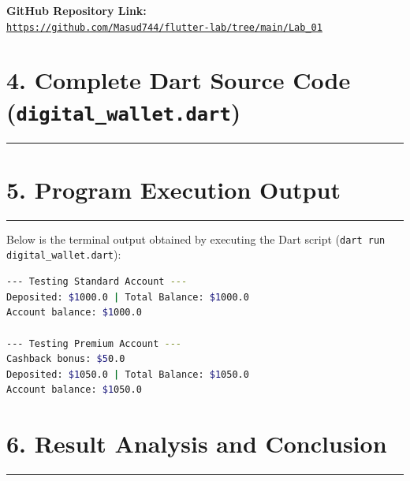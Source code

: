 \documentclass[11pt,a4paper]{article}
\begin{document}
\vspace{0.4cm}
\noindent\textbf{GitHub Repository Link:}\\
\href{https://github.com/Masud744/flutter-lab/tree/main/Lab_01}{\texttt{https://github.com/Masud744/flutter-lab/tree/main/Lab\_01}}

\newpage

\section*{4. Complete Dart Source Code (\texttt{digital\_wallet.dart})}
\noindent\rule{\textwidth}{0.5pt}\vspace{0.2cm}



\newpage

\section*{5. Program Execution Output}
\noindent\rule{\textwidth}{0.5pt}\vspace{0.2cm}

Below is the terminal output obtained by executing the Dart script (\texttt{dart run digital\_wallet.dart}):

\vspace{0.2cm}
\begin{lstlisting}[language=bash, basicstyle=\ttfamily\small, frame=single, backgroundcolor=\color{black!5}]
--- Testing Standard Account ---
Deposited: $1000.0 | Total Balance: $1000.0
Account balance: $1000.0

--- Testing Premium Account ---
Cashback bonus: $50.0
Deposited: $1050.0 | Total Balance: $1050.0
Account balance: $1050.0
\end{lstlisting}

\vspace{0.4cm}
\section*{6. Result Analysis and Conclusion}
\noindent\rule{\textwidth}{0.5pt}\vspace{0.15cm}
\end{document}

